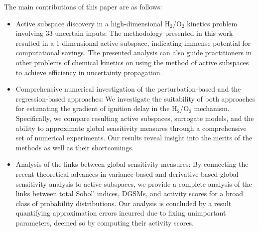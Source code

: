 The main contributions of this paper are as follows: 
\begin{itemize}
\item 
Active subspace
discovery in a high-dimensional H$_2$/O$_2$ kinetics problem involving 33
uncertain inputs: The methodology presented in this work
resulted in a 1-dimensional active subspace, indicating immense potential
for computational savings. The presented
analysis can also guide practitioners in other problems of chemical kinetics on using the
method of active subspaces to achieve efficiency in uncertainty propagation.  
\item Comprehensive numerical investigation of the perturbation-based and the regression-based approaches: 
We investigate the suitability of both approaches
for estimating the gradient of ignition delay in the H$_2$/O$_2$ mechanism.
Specifically, we compare resulting
active subspaces, surrogate models, and the ability to approximate global
sensitivity measures through a comprehensive set of numerical experiments. Our
results reveal insight into the merits of the methods as well as
their shortcomings.  
\item Analysis of the links between  
global sensitivity measures: 
By connecting the recent theoretical advances in variance-based and
derivative-based global sensitivity analysis to active subspaces, we provide a complete analysis
of the links between total Sobol' indices, DGSMs, and activity scores for a broad
class of probability distributions. Our analysis is concluded by a result quantifying
approximation errors incurred due to fixing unimportant parameters, deemed so by 
computing their activity scores.  

\end{itemize}

